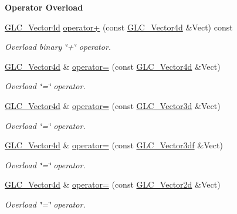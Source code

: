 \begin{Indent}{\bf Operator Overload}\par
\begin{DoxyCompactItemize}
\item 
\hyperlink{class_g_l_c___vector4d}{G\-L\-C\-\_\-\-Vector4d} \hyperlink{class_g_l_c___vector4d_acc56bcbee2aba625652f1e96090add7b}{operator+} (const \hyperlink{class_g_l_c___vector4d}{G\-L\-C\-\_\-\-Vector4d} \&Vect) const 
\begin{DoxyCompactList}\small\item\em Overload binary \char`\"{}+\char`\"{} operator. \end{DoxyCompactList}\item 
\hyperlink{class_g_l_c___vector4d}{G\-L\-C\-\_\-\-Vector4d} \& \hyperlink{class_g_l_c___vector4d_a6f2789cbe09eabdc6791d4c59b96d627}{operator=} (const \hyperlink{class_g_l_c___vector4d}{G\-L\-C\-\_\-\-Vector4d} \&Vect)
\begin{DoxyCompactList}\small\item\em Overload \char`\"{}=\char`\"{} operator. \end{DoxyCompactList}\item 
\hyperlink{class_g_l_c___vector4d}{G\-L\-C\-\_\-\-Vector4d} \& \hyperlink{class_g_l_c___vector4d_a6099d17b00841a9b08652757991f2bec}{operator=} (const \hyperlink{class_g_l_c___vector3d}{G\-L\-C\-\_\-\-Vector3d} \&Vect)
\begin{DoxyCompactList}\small\item\em Overload \char`\"{}=\char`\"{} operator. \end{DoxyCompactList}\item 
\hyperlink{class_g_l_c___vector4d}{G\-L\-C\-\_\-\-Vector4d} \& \hyperlink{class_g_l_c___vector4d_a16ecf067c0e736121eacf5c991e32afc}{operator=} (const \hyperlink{class_g_l_c___vector3df}{G\-L\-C\-\_\-\-Vector3df} \&Vect)
\begin{DoxyCompactList}\small\item\em Overload \char`\"{}=\char`\"{} operator. \end{DoxyCompactList}\item 
\hyperlink{class_g_l_c___vector4d}{G\-L\-C\-\_\-\-Vector4d} \& \hyperlink{class_g_l_c___vector4d_ae7f76e262a576e5854e309d4ec4a1df8}{operator=} (const \hyperlink{class_g_l_c___vector2d}{G\-L\-C\-\_\-\-Vector2d} \&Vect)
\begin{DoxyCompactList}\small\item\em Overload \char`\"{}=\char`\"{} operator. \end{DoxyCompactList}\item 

\end{DoxyCompactItemize}
\end{Indent}
